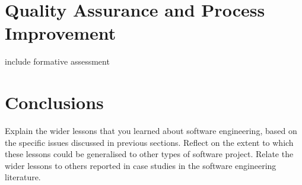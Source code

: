 \documentclass{l3proj}
\begin{document}
\section{Quality Assurance and Process Improvement}
\label{sec:managing}

include formative assessment

\section{Conclusions}

Explain the wider lessons that you learned about software engineering,
based on the specific issues discussed in previous sections.  Reflect
on the extent to which these lessons could be generalised to other
types of software project.  Relate the wider lessons to others
reported in case studies in the software engineering literature.




\end{document}
